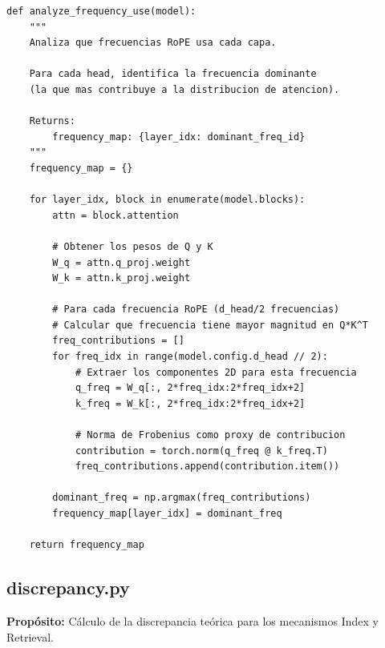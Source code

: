 \documentclass[12pt,a4paper]{report}
\begin{document}
\begin{lstlisting}
def analyze_frequency_use(model):
    """
    Analiza que frecuencias RoPE usa cada capa.
    
    Para cada head, identifica la frecuencia dominante
    (la que mas contribuye a la distribucion de atencion).
    
    Returns:
        frequency_map: {layer_idx: dominant_freq_id}
    """
    frequency_map = {}
    
    for layer_idx, block in enumerate(model.blocks):
        attn = block.attention
        
        # Obtener los pesos de Q y K
        W_q = attn.q_proj.weight
        W_k = attn.k_proj.weight
        
        # Para cada frecuencia RoPE (d_head/2 frecuencias)
        # Calcular que frecuencia tiene mayor magnitud en Q*K^T
        freq_contributions = []
        for freq_idx in range(model.config.d_head // 2):
            # Extraer los componentes 2D para esta frecuencia
            q_freq = W_q[:, 2*freq_idx:2*freq_idx+2]
            k_freq = W_k[:, 2*freq_idx:2*freq_idx+2]
            
            # Norma de Frobenius como proxy de contribucion
            contribution = torch.norm(q_freq @ k_freq.T)
            freq_contributions.append(contribution.item())
        
        dominant_freq = np.argmax(freq_contributions)
        frequency_map[layer_idx] = dominant_freq
    
    return frequency_map
\end{lstlisting}

\subsection{discrepancy.py}
\label{subsec:discrepancy}

\textbf{Propósito:} Cálculo de la discrepancia teórica para los mecanismos Index y Retrieval.
\end{document}
